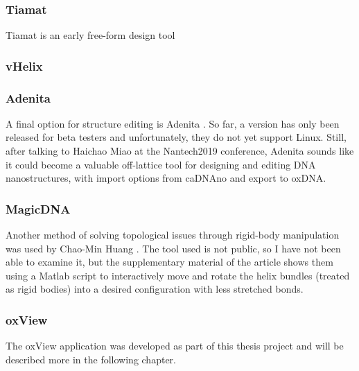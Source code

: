 \subsubsection{Tiamat}
Tiamat is an early free-form design tool

\subsubsection{vHelix}

\subsubsection{Adenita}
A final option for structure editing is Adenita \cite{miao_tvcg_2018}. So far, a version has only been released for beta testers and unfortunately, they do not yet support Linux. Still, after talking to Haichao Miao at the Nantech2019 conference, Adenita sounds like it could become a valuable off-lattice tool for designing and editing DNA nanostructures, with import options from caDNAno and export to oxDNA.

\subsubsection{MagicDNA}
Another method of solving topological issues through rigid-body manipulation was used by Chao-Min Huang \cite{huang2019uncertainty}. The tool used is not public, so I have not been able to examine it, but the supplementary material of the article shows them using a Matlab script to interactively move and rotate the helix bundles (treated as rigid bodies) into a desired configuration with less stretched bonds.

\subsubsection{oxView}
The oxView application was developed as part of this thesis project and will be described more in the following chapter.